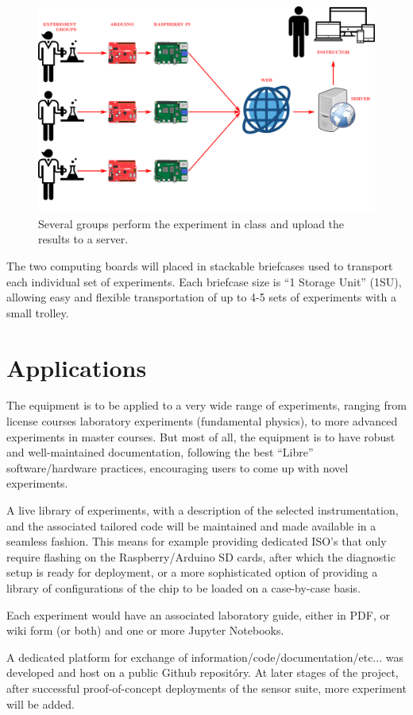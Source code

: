 \documentclass[conference]{IEEEtran}
\begin{document}
\begin{figure}[htbp]
\centerline{\includegraphics[width=.6\columnwidth]{Multiple.png}}
\caption{Several groups perform the experiment in class and upload the results to a server.}
\label{figMultiple}
\end{figure}

The two computing boards will placed in stackable briefcases used to transport each individual set of experiments.
Each briefcase size is “1 Storage Unit” (1SU), allowing easy and flexible transportation of up to 4-5 sets of experiments with a small trolley.


\section{Applications}
The equipment is to be applied to a very wide range of experiments, ranging from license courses laboratory experiments (fundamental physics), 
to more advanced experiments in master courses. 
But most of all, the equipment is to have robust and well-maintained documentation, 
following the best “Libre” software/hardware practices, encouraging users to come up with novel experiments.

A live library of experiments, with a description of the selected instrumentation, and the associated tailored code will be maintained and made available in a seamless fashion. 
This means for example providing dedicated ISO’s that only require flashing on the Raspberry/Arduino SD cards, after which the diagnostic setup is ready for deployment,
or a more sophisticated option of providing a library of configurations of the chip to be loaded on a case-by-case basis.

Each experiment would have an associated laboratory guide, either in PDF, or wiki form (or both) and one or more Jupyter\cite{j2} Notebooks. 

A dedicated platform for exchange of information/code/documentation/etc... was developed and host on a public Github\cite{gh} repositóry. 
At later stages of the project, after successful proof-of-concept deployments of the sensor suite, more experiment will be added.
\end{document}
